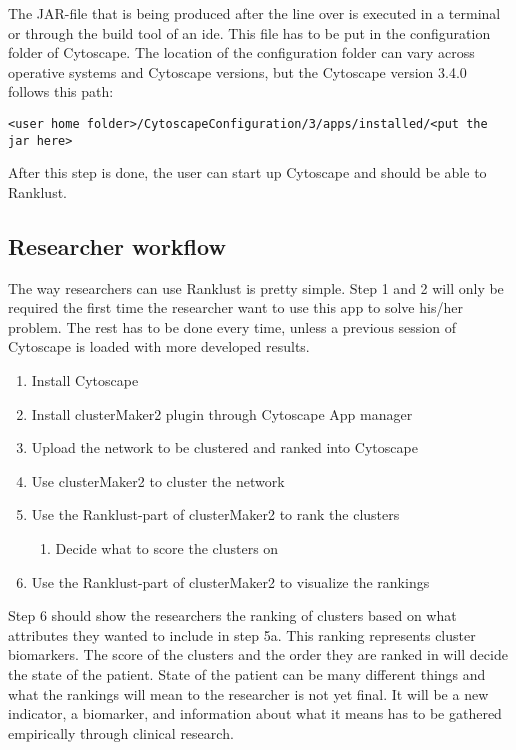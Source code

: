 The JAR-file that is being produced after the line over is executed in
a terminal or through the build tool of an \gls{ide}. This file has to be put in
the configuration folder of Cytoscape. The location of the configuration folder
can vary across operative systems and Cytoscape versions, but the Cytoscape
version 3.4.0 follows this path:
\begin{verbatim}
<user home folder>/CytoscapeConfiguration/3/apps/installed/<put the jar here>
\end{verbatim}

After this step is done, the user can start up Cytoscape and should be able to
Ranklust.

\subsection{Researcher workflow}
The way researchers can use Ranklust is pretty simple. Step 1 and 2 will only be
required the first time the researcher want to use this app to solve his/her
problem. The rest has to be done every time, unless a previous session of
Cytoscape is loaded with more developed results.

\begin{enumerate}
    \item Install Cytoscape
    \item Install clusterMaker2 plugin through Cytoscape App manager
    \item Upload the network to be clustered and ranked into Cytoscape
    \item Use clusterMaker2 to cluster the network
    \item Use the Ranklust-part of clusterMaker2 to rank the clusters
        \begin{enumerate}
            \item Decide what to score the clusters on
        \end{enumerate}
    \item Use the Ranklust-part of clusterMaker2 to visualize the rankings
\end{enumerate}

Step 6 should show the researchers the ranking of clusters based on what
attributes they wanted to include in step 5a. This ranking represents cluster
biomarkers. The score of the clusters and the order they are ranked in will
decide the state of the patient. State of the patient can be many different
things and what the rankings will mean to the researcher is not yet final. It
will be a new indicator, a biomarker, and information about what it means has to
be gathered empirically through clinical research.

